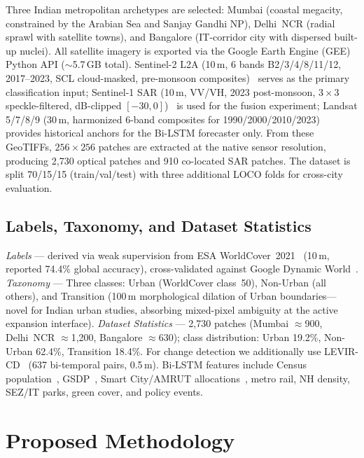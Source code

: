 \documentclass[conference]{IEEEtran}
\begin{document}
Three Indian metropolitan archetypes are selected: Mumbai (coastal megacity, constrained by the Arabian Sea and Sanjay Gandhi NP), Delhi~NCR (radial sprawl with satellite towns), and Bangalore (IT-corridor city with dispersed built-up nuclei). All satellite imagery is exported via the Google Earth Engine (GEE) Python API ($\sim$5.7\,GB total). Sentinel-2 L2A (10\,m, 6 bands B2/3/4/8/11/12, 2017--2023, SCL cloud-masked, pre-monsoon composites)~\cite{sentinel2} serves as the primary classification input; Sentinel-1 SAR (10\,m, VV/VH, 2023 post-monsoon, $3{\times}3$ speckle-filtered, dB-clipped $[-30, 0]$)~\cite{sentinel1} is used for the fusion experiment; Landsat 5/7/8/9 (30\,m, harmonized 6-band composites for 1990/2000/2010/2023)~\cite{landsat} provides historical anchors for the Bi-LSTM forecaster only. From these GeoTIFFs, $256{\times}256$ patches are extracted at the native sensor resolution, producing 2{,}730 optical patches and 910 co-located SAR patches. The dataset is split 70/15/15 (train/val/test) with three additional LOCO folds for cross-city evaluation.

\subsection{Labels, Taxonomy, and Dataset Statistics}

\emph{Labels} --- derived via weak supervision from ESA WorldCover~2021~\cite{zanaga2022} (10\,m, reported 74.4\% global accuracy), cross-validated against Google Dynamic World~\cite{brown2022}.
\emph{Taxonomy} --- Three classes: Urban (WorldCover class~50), Non-Urban (all others), and Transition (100\,m morphological dilation of Urban boundaries---novel for Indian urban studies, absorbing mixed-pixel ambiguity at the active expansion interface).
\emph{Dataset Statistics} --- 2{,}730 patches (Mumbai $\approx$900, Delhi~NCR $\approx$1{,}200, Bangalore $\approx$630); class distribution: Urban 19.2\%, Non-Urban 62.4\%, Transition 18.4\%. For change detection we additionally use LEVIR-CD~\cite{chen2020levir} (637 bi-temporal pairs, 0.5\,m). Bi-LSTM features include Census population~\cite{census2011}, GSDP~\cite{rbi}, Smart City/AMRUT allocations~\cite{smartcity}, metro rail, NH density, SEZ/IT parks, green cover, and policy events.

\section{Proposed Methodology}
\end{document}
